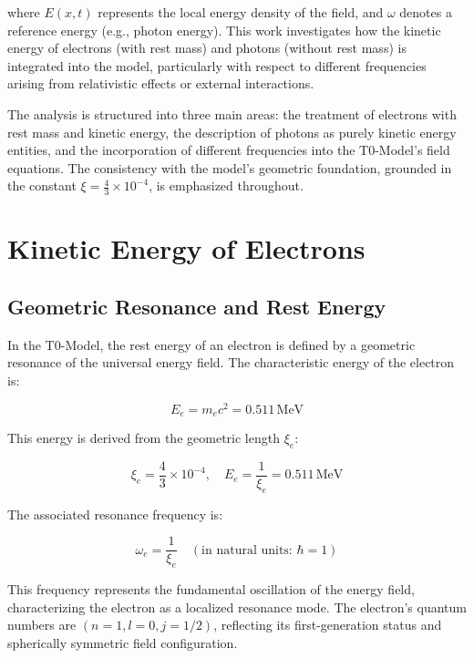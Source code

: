 \documentclass[12pt,a4paper]{article}
\begin{document}
	where \( E(x,t) \) represents the local energy density of the field, and \(\omega\) denotes a reference energy (e.g., photon energy). This work investigates how the kinetic energy of electrons (with rest mass) and photons (without rest mass) is integrated into the model, particularly with respect to different frequencies arising from relativistic effects or external interactions.
	
	The analysis is structured into three main areas: the treatment of electrons with rest mass and kinetic energy, the description of photons as purely kinetic energy entities, and the incorporation of different frequencies into the T0-Model's field equations. The consistency with the model's geometric foundation, grounded in the constant \(\xi = \frac{4}{3} \times 10^{-4}\), is emphasized throughout.
	
	\section{Kinetic Energy of Electrons}
	\label{sec:electron_kinetic_energy}
	
	\subsection{Geometric Resonance and Rest Energy}
	\label{subsec:electron_rest_energy}
	
	In the T0-Model, the rest energy of an electron is defined by a geometric resonance of the universal energy field. The characteristic energy of the electron is:
	
	\begin{equation}
		E_e = m_e c^2 = 0.511 \, \text{MeV}
	\end{equation}
	
	This energy is derived from the geometric length \(\xi_e\):
	
	\begin{equation}
		\xi_e = \frac{4}{3} \times 10^{-4}, \quad E_e = \frac{1}{\xi_e} = 0.511 \, \text{MeV}
		\label{eq:electron_energy}
	\end{equation}
	
	The associated resonance frequency is:
	
	\begin{equation}
		\omega_e = \frac{1}{\xi_e} \quad (\text{in natural units: } \hbar = 1)
	\end{equation}
	
	This frequency represents the fundamental oscillation of the energy field, characterizing the electron as a localized resonance mode. The electron's quantum numbers are \((n=1, l=0, j=1/2)\), reflecting its first-generation status and spherically symmetric field configuration.
	
\end{document}
